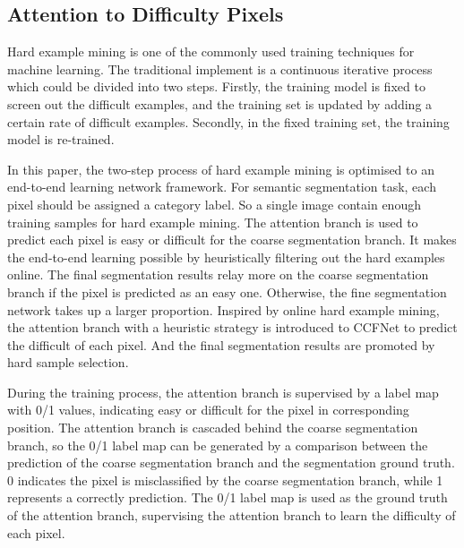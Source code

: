 \documentclass[10.5pt,compsoc]{TsT}
\theoremstyle{mystyle}
\begin{document}
{%


\subsection{Attention to Difficulty Pixels}
\label{s:attention}
\noindent


Hard example mining is one of the commonly used training techniques for machine learning.
The traditional implement is a continuous iterative process which could be divided into two steps.
Firstly, the training model is fixed to screen out the difficult examples, and the training set is updated by adding a certain rate of difficult examples.
Secondly, in the fixed training set, the training model is re-trained.

In this paper, the two-step process of hard example mining is optimised to an end-to-end learning network framework.
For semantic segmentation task, each pixel should be assigned a category label.
So a single image contain enough training samples for hard example mining.
The attention branch is used to predict each pixel is easy or difficult for the coarse segmentation branch.
It makes the end-to-end learning possible by heuristically filtering out the hard examples online.
The final segmentation results relay more on the coarse segmentation branch if the pixel is predicted as an easy one.
Otherwise, the fine segmentation network takes up a larger proportion.
Inspired by online hard example mining, the attention branch with a heuristic strategy is introduced to CCFNet to predict the difficult of each pixel.
And the final segmentation results are promoted by hard sample selection.


During the training process, the attention branch is supervised by a label map with 0/1 values, indicating  easy or difficult for the pixel in corresponding position.
The attention branch is cascaded behind the coarse segmentation branch, so the 0/1 label map can be generated by a comparison between the prediction of the coarse segmentation branch and the segmentation ground truth.
0 indicates the pixel is misclassified by the coarse segmentation branch, while 1 represents a correctly prediction.
The 0/1 label map is used as the ground truth of the attention branch, supervising the attention branch to learn the difficulty of each pixel.

}
\end{document}
